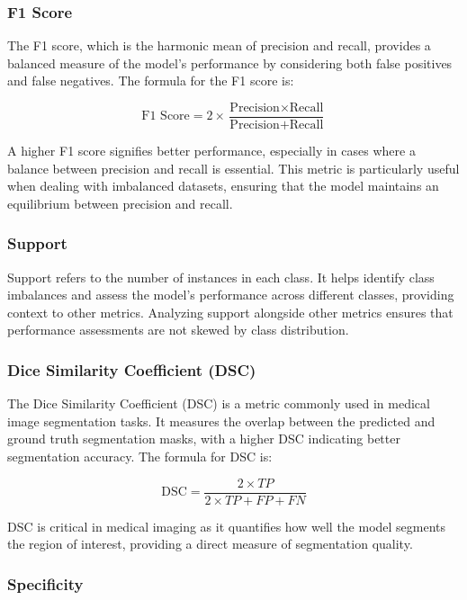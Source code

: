 \subsubsection{F1 Score}

The F1 score, which is the harmonic mean of precision and recall, provides a balanced measure of the model's performance by considering both false positives and false negatives. The formula for the F1 score is:

\[
\text{F1 Score} = 2 \times \frac{\text{Precision} \times \text{Recall}}{\text{Precision} + \text{Recall}}
\]

A higher F1 score signifies better performance, especially in cases where a balance between precision and recall is essential. This metric is particularly useful when dealing with imbalanced datasets, ensuring that the model maintains an equilibrium between precision and recall.

\subsubsection{Support}

Support refers to the number of instances in each class. It helps identify class imbalances and assess the model's performance across different classes, providing context to other metrics. Analyzing support alongside other metrics ensures that performance assessments are not skewed by class distribution.

\subsubsection{Dice Similarity Coefficient (DSC)}

The Dice Similarity Coefficient (DSC) is a metric commonly used in medical image segmentation tasks. It measures the overlap between the predicted and ground truth segmentation masks, with a higher DSC indicating better segmentation accuracy. The formula for DSC is:

\[
\text{DSC} = \frac{2 \times TP}{2 \times TP + FP + FN}
\]

DSC is critical in medical imaging as it quantifies how well the model segments the region of interest, providing a direct measure of segmentation quality.

\subsubsection{Specificity}

